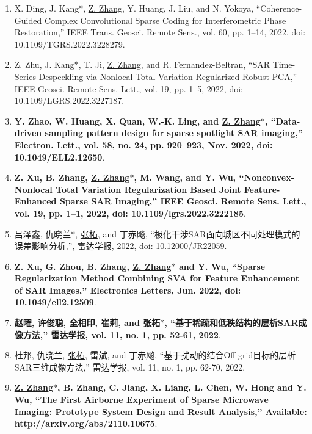 \documentclass[paper=a4,fontsize=11pt]{scrartcl}
\begin{document}
\begin{enumerate}
\item X. Ding, J. Kang$\ast$, \underline{Z. Zhang}, Y. Huang, J. Liu, and N. Yokoya, ``Coherence-Guided Complex Convolutional Sparse Coding for Interferometric Phase Restoration,'' IEEE Trans. Geosci. Remote Sens., vol. 60, pp. 1–14, 2022, doi: 10.1109/TGRS.2022.3228279.

\item Z. Zhu, J. Kang$\ast$, T. Ji, \underline{Z. Zhang}, and R. Fernandez-Beltran, ``SAR Time-Series Despeckling via Nonlocal Total Variation Regularized Robust PCA,'' IEEE Geosci. Remote Sens. Lett., vol. 19, pp. 1–5, 2022, doi: 10.1109/LGRS.2022.3227187.​
	
\item \textbf{Y. Zhao, W. Huang, X. Quan, W.-K. Ling, and \underline{Z. Zhang$\ast$}, ``Data-driven sampling pattern design for sparse spotlight SAR imaging,'' Electron. Lett., vol. 58, no. 24, pp. 920–923, Nov. 2022, doi: 10.1049/ELL2.12650}.

\item \textbf{Z. Xu, B. Zhang, \underline{Z. Zhang$\ast$}, M. Wang, and Y. Wu, ``Nonconvex-Nonlocal Total Variation Regularization Based Joint Feature-Enhanced Sparse SAR Imaging,'' IEEE Geosci. Remote Sens. Lett., vol. 19, pp. 1–1, 2022, doi: 10.1109/lgrs.2022.3222185}.

\item 吕泽鑫, 仇晓兰$\ast$, \underline{张柘}, and 丁赤飚, ``极化干涉SAR面向城区不同处理模式的误差影响分析,'', 雷达学报, 2022, doi: 10.12000/JR22059.

\item \textbf{Z. Xu, G. Zhou, B. Zhang, \underline{Z. Zhang$\ast$} and Y. Wu, ``Sparse Regularization Method Combining SVA for Feature Enhancement of SAR Images,'' Electronics Letters, Jun. 2022, doi: 10.1049/ell2.12509}.

\item \textbf{赵曜, 许俊聪, 全相印, 崔莉, and \underline{张柘$\ast$}, ``基于稀疏和低秩结构的层析SAR成像方法,'' 雷达学报, vol. 11, no. 1, pp. 52-61, 2022}.

\item 杜邦, 仇晓兰, \underline{张柘}, 雷斌, and 丁赤飚, ``基于扰动的结合Off-grid目标的层析SAR三维成像方法,'' 雷达学报, vol. 11, no. 1, pp. 62-70, 2022.


\item \textbf{\underline{Z. Zhang$\ast$}, B. Zhang, C. Jiang, X. Liang, L. Chen, W. Hong and Y. Wu, ``The First Airborne Experiment of Sparse Microwave Imaging: Prototype System Design and Result Analysis,'' Available: http://arxiv.org/abs/2110.10675}.


\end{enumerate}
\end{document}
